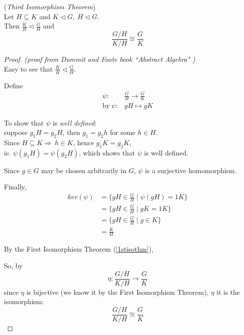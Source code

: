 \documentclass{article}
\theoremstyle{definition}
\newenvironment{thm}[1]
{\renewcommand\theinnerthm{#1}\innerthm}
{\endinnerthm}
\begin{document}
\begin{thm}{i.3}(\emph{Third Isomorphism Theorem}) \label{3rdisothm}\\
  Let $H \subseteq K$ and $K \triangleleft G,~ H \triangleleft G$.\\
  Then
  $\frac{K}{H} \triangleleft \frac{G}{H}$
  and
  $$\frac{ G/H }{ K/H } \cong \frac{G}{K}$$
\end{thm}
\begin{proof}
  \emph{(proof from Dummit and Foote book ``Abstract Algebra" \cite{dummitfoote})}\\

  Easy to see that $\frac{K}{H} \triangleleft \frac{G}{H}$.

  Define
      \begin{align*}
	\psi: &\frac{G}{H} \longrightarrow \frac{G}{K}\\
	\text{by}~ \psi: &gH \longmapsto gK
      \end{align*}

  To show that $\psi$ is \emph{well defined}:\\
  suppose $g_1 H = g_2 H$, then $g_1 = g_2 h$ for some $h \in H$.\\
  Since $H \subseteq K \Longrightarrow~ h \in K$, hence $g_1 K = g_2 K$,\\
  ie. $\psi(g_1 H) = \psi(g_2 H)$, which shows that $\psi$ is well defined.

  Since $g \in G$ may be chosen arbitrarily in $G$, $\psi$ is a surjective homomorphism.


  Finally,
  \begin{align*}
    ker(\psi) &= \{ gH \in \frac{G}{H} \mid \psi(gH)=1K \}\\
    &= \{ gH \in \frac{G}{H} \mid gK =1K \}\\
    &= \{ gH \in \frac{G}{H} \mid g \in K \}\\
    &= \frac{K}{H}
  \end{align*}


  By the First Isomorphism Theorem (\ref{1stisothm}),


  So, by
  $$\eta: \frac{G/H}{K/H} \longrightarrow \frac{G}{K}$$
  since $\eta$ is
  bijective (we know it by the First Isomorphism Theorem), $\eta$ it is the isomorphism:
  $$\frac{ G/H }{ K/H } \cong \frac{G}{K}$$


\end{proof}
\end{document}

